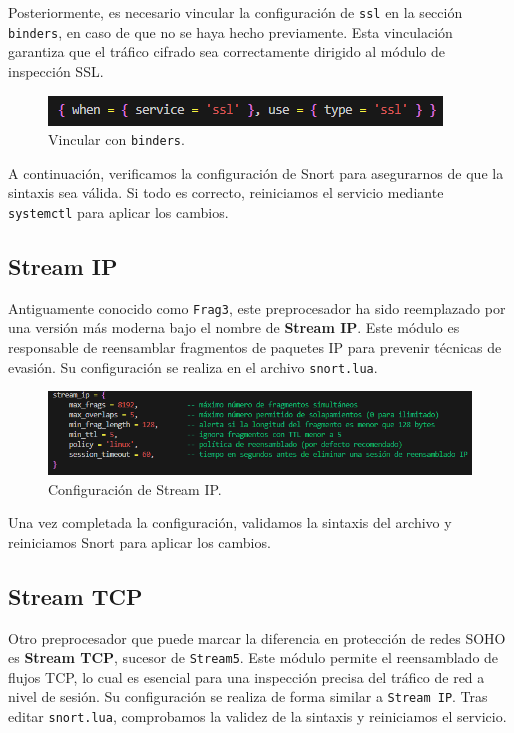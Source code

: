 \documentclass[11pt,a4paper,twoside]{report}
\begin{document}
Posteriormente, es necesario vincular la configuración de \texttt{ssl} en la sección \texttt{binders}, en caso de que no se haya hecho previamente. Esta vinculación garantiza que el tráfico cifrado sea correctamente dirigido al módulo de inspección SSL.

\begin{figure}[H]
	\centering
	\includegraphics[scale=0.8]{ssl_inspect/9.png}
	\caption{Vincular con \texttt{binders}.}
\end{figure}

A continuación, verificamos la configuración de Snort para asegurarnos de que la sintaxis sea válida. Si todo es correcto, reiniciamos el servicio mediante \texttt{systemctl} para aplicar los cambios.

\subsection{Stream IP}

Antiguamente conocido como \texttt{Frag3}, este preprocesador ha sido reemplazado por una versión más moderna bajo el nombre de \textbf{Stream IP}. Este módulo es responsable de reensamblar fragmentos de paquetes IP para prevenir técnicas de evasión. Su configuración se realiza en el archivo \texttt{snort.lua}.

\begin{figure}[H]
	\centering
	\includegraphics[scale=0.8]{stream_ip/1.png}
	\caption{Configuración de Stream IP.}
\end{figure}

Una vez completada la configuración, validamos la sintaxis del archivo y reiniciamos Snort para aplicar los cambios.

\newpage

\subsection{Stream TCP}

Otro preprocesador que puede marcar la diferencia en protección de redes SOHO es \textbf{Stream TCP}, sucesor de \texttt{Stream5}. Este módulo permite el reensamblado de flujos TCP, lo cual es esencial para una inspección precisa del tráfico de red a nivel de sesión. Su configuración se realiza de forma similar a \texttt{Stream IP}. Tras editar \texttt{snort.lua}, comprobamos la validez de la sintaxis y reiniciamos el servicio.
\end{document}
